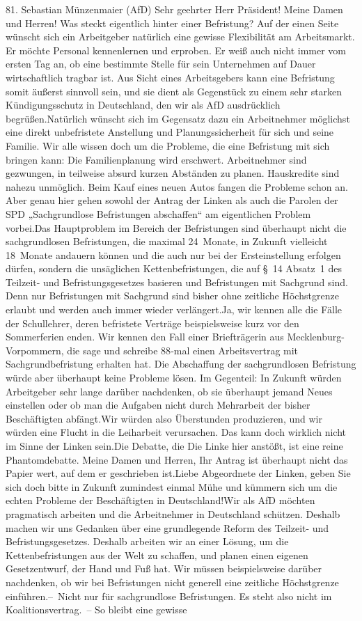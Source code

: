 \documentclass{article}
\begin{document}
	81. Sebastian Münzenmaier (AfD) Sehr geehrter Herr Präsident! Meine Damen und Herren! Was steckt eigentlich hinter einer Befristung? Auf der einen Seite wünscht sich ein Arbeitgeber natürlich eine gewisse Flexibilität am Arbeitsmarkt. Er möchte Personal kennenlernen und erproben. Er weiß auch nicht immer vom ersten Tag an, ob eine bestimmte Stelle für sein Unternehmen auf Dauer wirtschaftlich tragbar ist. Aus Sicht eines Arbeitsgebers kann eine Befristung somit äußerst sinnvoll sein, und sie dient als Gegenstück zu einem sehr starken Kündigungsschutz in Deutschland, den wir als AfD ausdrücklich begrüßen.Natürlich wünscht sich im Gegensatz dazu ein Arbeitnehmer möglichst eine direkt unbefristete Anstellung und Planungssicherheit für sich und seine Familie. Wir alle wissen doch um die Probleme, die eine Befristung mit sich bringen kann: Die Familienplanung wird erschwert. Arbeitnehmer sind gezwungen, in teilweise absurd kurzen Abständen zu planen. Hauskredite sind nahezu unmöglich. Beim Kauf eines neuen Autos fangen die Probleme schon an. Aber genau hier gehen sowohl der Antrag der Linken als auch die Parolen der SPD „Sachgrundlose Befristungen abschaffen“ am eigentlichen Problem vorbei.Das Hauptproblem im Bereich der Befristungen sind überhaupt nicht die sachgrundlosen Befristungen, die maximal 24 Monate, in Zukunft vielleicht 18 Monate andauern können und die auch nur bei der Ersteinstellung erfolgen dürfen, sondern die unsäglichen Kettenbefristungen, die auf § 14 Absatz 1 des Teilzeit- und Befristungsgesetzes basieren und Befristungen mit Sachgrund sind. Denn nur Befristungen mit Sachgrund sind bisher ohne zeitliche Höchstgrenze erlaubt und werden auch immer wieder verlängert.Ja, wir kennen alle die Fälle der Schullehrer, deren befristete Verträge beispielsweise kurz vor den Sommerferien enden. Wir kennen den Fall einer Briefträgerin aus Mecklenburg-Vorpommern, die sage und schreibe 88‑mal einen Arbeitsvertrag mit Sachgrundbefristung erhalten hat. Die Abschaffung der sachgrundlosen Befristung würde aber überhaupt keine Probleme lösen. Im Gegenteil: In Zukunft würden Arbeitgeber sehr lange darüber nachdenken, ob sie überhaupt jemand Neues einstellen oder ob man die Aufgaben nicht durch Mehrarbeit der bisher Beschäftigten abfängt.Wir würden also Überstunden produzieren, und wir würden eine Flucht in die Leiharbeit verursachen. Das kann doch wirklich nicht im Sinne der Linken sein.Die Debatte, die Die Linke hier anstößt, ist eine reine Phantomdebatte. Meine Damen und Herren, Ihr Antrag ist überhaupt nicht das Papier wert, auf dem er geschrieben ist.Liebe Abgeordnete der Linken, geben Sie sich doch bitte in Zukunft zumindest einmal Mühe und kümmern sich um die echten Probleme der Beschäftigten in Deutschland!Wir als AfD möchten pragmatisch arbeiten und die Arbeitnehmer in Deutschland schützen. Deshalb machen wir uns Gedanken über eine grundlegende Reform des Teilzeit- und Befristungsgesetzes. Deshalb arbeiten wir an einer Lösung, um die Kettenbefristungen aus der Welt zu schaffen, und planen einen eigenen Gesetzentwurf, der Hand und Fuß hat. Wir müssen beispielsweise darüber nachdenken, ob wir bei Befristungen nicht generell eine zeitliche Höchstgrenze einführen.– Nicht nur für sachgrundlose Befristungen. Es steht also nicht im Koalitionsvertrag. – So bleibt eine gewisse 
\end{document}
